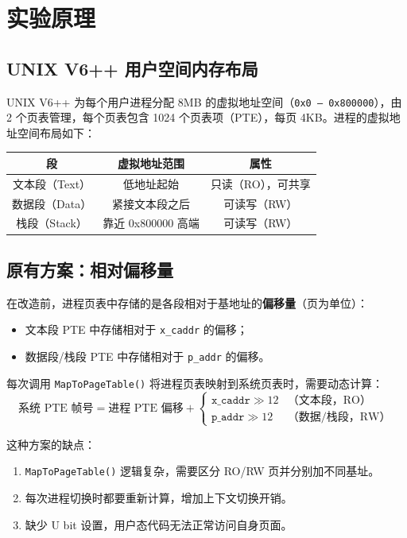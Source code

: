 \documentclass[12pt]{article}
\begin{document}
\section{实验原理}

\subsection{UNIX V6++ 用户空间内存布局}

UNIX V6++ 为每个用户进程分配 8MB 的虚拟地址空间（\texttt{0x0 -- 0x800000}），由 2 个页表管理，每个页表包含 1024 个页表项（PTE），每页 4KB。进程的虚拟地址空间布局如下：

\begin{table}[H]
\centering
\begin{tabular}{ccc}
\toprule
\textbf{段} & \textbf{虚拟地址范围} & \textbf{属性} \\
\midrule
文本段（Text）  & 低地址起始 & 只读（RO），可共享 \\
数据段（Data）  & 紧接文本段之后 & 可读写（RW） \\
栈段（Stack）   & 靠近 0x800000 高端 & 可读写（RW） \\
\bottomrule
\end{tabular}
\end{table}

\subsection{原有方案：相对偏移量}

在改造前，进程页表中存储的是各段相对于基地址的\textbf{偏移量}（页为单位）：
\begin{itemize}
    \item 文本段 PTE 中存储相对于 \texttt{x\_caddr} 的偏移；
    \item 数据段/栈段 PTE 中存储相对于 \texttt{p\_addr} 的偏移。
\end{itemize}

每次调用 \texttt{MapToPageTable()} 将进程页表映射到系统页表时，需要动态计算：
\[
\text{系统 PTE 帧号} = \text{进程 PTE 偏移} +
\begin{cases}
\texttt{x\_caddr} \gg 12 & \text{（文本段，RO）} \\
\texttt{p\_addr} \gg 12 & \text{（数据/栈段，RW）}
\end{cases}
\]

这种方案的缺点：
\begin{enumerate}
    \item \texttt{MapToPageTable()} 逻辑复杂，需要区分 RO/RW 页并分别加不同基址。
    \item 每次进程切换时都要重新计算，增加上下文切换开销。
    \item 缺少 U bit 设置，用户态代码无法正常访问自身页面。
\end{enumerate}
\end{document}
